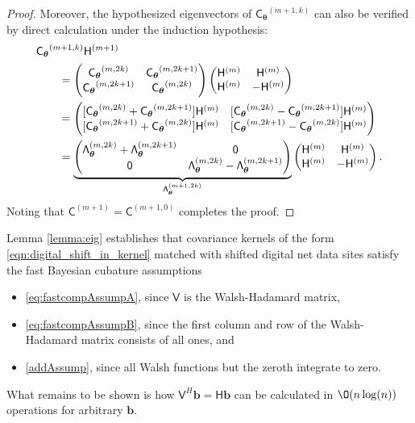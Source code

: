 \documentclass[graybox,footinfo]{svmult}
\newcommand{\bm}[1]{\boldsymbol{#1}}
\newcommand{\vtheta}{{\bm{\theta}}}
\newcommand{\vb}{\bm{b}}
\newcommand{\mC}{\mathsf{C}}
\newcommand{\mCtheta}{{\mathsf{C}_{\vtheta}}}
\newcommand{\mLambda}{\mathsf{\Lambda}}
\newcommand{\mH}{\mathsf{H}}
\newcommand{\mV}{\mathsf{V}}
\begin{document}
\begin{proof}
    Moreover, the hypothesized eigenvectors of $\mCtheta^{(m+1,k)}$ can also be verified by direct calculation under the induction hypothesis:
     \begin{align*}
        \MoveEqLeft{\mCtheta^{(m+1,k)} \mH^{(m+1)}} \\
        & =  
        \begin{pmatrix} \mCtheta^{(m,2k)} & \mCtheta^{(m,2k+1)} \\
        \mCtheta^{(m,2k+1)} & \mCtheta^{(m,2k)}
        \end{pmatrix} 
        \begin{pmatrix}
        \mH^{(m)} &   \mH^{(m)} \\
         \mH^{(m)} & - \mH^{(m)}
        \end{pmatrix}\\
        & = 
    \begin{pmatrix}
        [\mCtheta^{(m,2k)} + \mCtheta^{(m,2k+1)}] \mH^{(m)} & [\mCtheta^{(m,2k)} - \mCtheta^{(m,2k+1)}] \mH^{(m)}\\
        [\mCtheta^{(m,2k+1)} + \mCtheta^{(m,2k)}] \mH^{(m)} &   [\mCtheta^{(m,2k+1)} - \mCtheta^{(m,2k)}] \mH^{(m)}
        \end{pmatrix} \\
        & = \underbrace{\begin{pmatrix}
        \mLambda_\vtheta^{(m,2k)} + \mLambda_\vtheta^{(m,2k+1)}  & \mathsf{0}\\
        \mathsf{0} &   \mLambda_\vtheta^{(m,2k)} - \mLambda_\vtheta^{(m,2k+1)}
        \end{pmatrix}}_{\mLambda_\vtheta^{(m+1,2k)}} 
        \begin{pmatrix}
        \mH^{(m)} & \mH^{(m)} \\ \mH^{(m)} & -\mH^{(m)}
        \end{pmatrix}.
    \end{align*}
Noting that $\mC^{(m+1)} = \mC^{(m+1,0)} $ completes the proof.
\end{proof}

Lemma \ref{lemma:eig} establishes that covariance kernels of the form \eqref{eqn:digital_shift_in_kernel} matched with shifted digital net data sites satisfy the fast Bayesian cubature assumptions
\begin{itemize}
    \item \eqref{eq:fastcompAssumpA}, since $\mV$ is the Walsh-Hadamard matrix,
    
    \item  \eqref{eq:fastcompAssumpB}, since the first column and row of the  Walsh-Hadamard matrix consists of all ones, and
    
    \item \eqref{addAssump}, since all Walsh functions but the zeroth integrate to zero.
\end{itemize}
What remains to be shown is how $\mV^H \vb = \mH \vb$ can be calculated in $\O(n \log(n))$ operations for arbitrary $\vb$.
\end{document}
